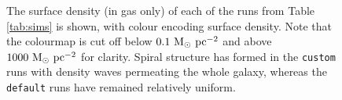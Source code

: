 \begin{figure}[!ht]
    \leavevmode\rlap{\usebox{\graphicsbox}}%
    \begin{minipage}[b]{0.63\wd\graphicsbox}%
        \caption{The surface density (in gas only) of each of the runs from Table \ref{tab:sims} is shown, with colour encoding surface density. Note that the colourmap is cut off below $0.1 ~\mathrm{M}_{\odot} ~\mathrm{pc}^{-2}$ and above $1000 ~\mathrm{M}_{\odot} ~\mathrm{pc}^{-2}$ for clarity. Spiral structure has formed in the {\tt custom} runs with density waves permeating the whole galaxy, whereas the {\tt default} runs have remained relatively uniform.}
        \label{fig:sdbig}
    \end{minipage}\hspace*{0.33\wd\graphicsbox}%
\end{figure}


